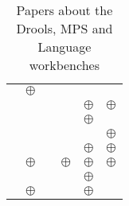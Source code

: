 \begin{table}[H]
\begin{tabular}{l || c | c | c | c | c}
        \cite{voelter2013dsl}            & $\oplus$ &          &          &          &          \\
        \cite{voelter2019lessons}        &          &          &          & $\oplus$ & $\oplus$ \\
        \cite{voelter2019shadow}         &          &          &          & $\oplus$ &          \\
        \cite{voelter2014towards}        &          &          &          &          & $\oplus$ \\
        \cite{voelter2015using}          &          &          &          & $\oplus$ & $\oplus$ \\
        \cite{voelter2019using}          & $\oplus$ &          & $\oplus$ & $\oplus$ & $\oplus$ \\
        \cite{vysoky2016grammar}         &          &          &          & $\oplus$ &          \\
        \cite{wortmann2016domain}        & $\oplus$ &          &          & $\oplus$ &          \\
    \end{tabular}
	\caption{Papers about the Drools, MPS and Language workbenches}
    \label{table:literature_review}
\end{table}


